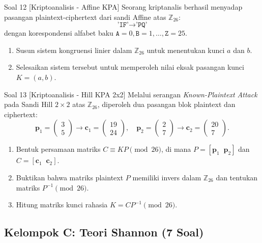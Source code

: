 \documentclass[11pt,a4paper]{article}
\begin{document}
\begin{soalanalisis}{Soal 12 [Kriptoanalisis - Affine KPA]}
Seorang kriptanalis berhasil menyadap pasangan plaintext-ciphertext dari sandi Affine atas $\mathbb{Z}_{26}$:
\[
\texttt{'IF'} \longrightarrow \texttt{'PQ'}
\]
dengan korespondensi alfabet baku $\texttt{A}=0, \texttt{B}=1, \dots, \texttt{Z}=25$.
\begin{enumerate}[label=(\alph*)]
    \item Susun sistem kongruensi linier dalam $\mathbb{Z}_{26}$ untuk menentukan kunci $a$ dan $b$.
    \item Selesaikan sistem tersebut untuk memperoleh nilai eksak pasangan kunci $K = (a, b)$.
\end{enumerate}
\end{soalanalisis}

\begin{soalanalisis}{Soal 13 [Kriptoanalisis - Hill KPA 2x2]}
Melalui serangan \textit{Known-Plaintext Attack} pada Sandi Hill $2 \times 2$ atas $\mathbb{Z}_{26}$, diperoleh dua pasangan blok plaintext dan ciphertext:
\[
\mathbf{p}_1 = \begin{pmatrix} 3 \\ 5 \end{pmatrix} \to \mathbf{c}_1 = \begin{pmatrix} 19 \\ 24 \end{pmatrix}, \quad \mathbf{p}_2 = \begin{pmatrix} 2 \\ 7 \end{pmatrix} \to \mathbf{c}_2 = \begin{pmatrix} 20 \\ 7 \end{pmatrix}.
\]
\begin{enumerate}[label=(\alph*)]
    \item Bentuk persamaan matriks $C \equiv K P \pmod{26}$, di mana $P = [\mathbf{p}_1 \;\; \mathbf{p}_2]$ dan $C = [\mathbf{c}_1 \;\; \mathbf{c}_2]$.
    \item Buktikan bahwa matriks plaintext $P$ memiliki invers dalam $\mathbb{Z}_{26}$ dan tentukan matriks $P^{-1} \pmod{26}$.
    \item Hitung matriks kunci rahasia $K = C P^{-1} \pmod{26}$.
\end{enumerate}
\end{soalanalisis}

\newpage
\subsection{Kelompok C: Teori Shannon (7 Soal)}
\end{document}
